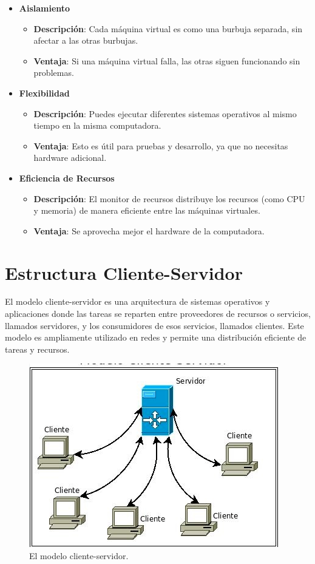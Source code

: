 \begin{itemize}
	\item \textbf{Aislamiento}
	\begin{itemize}
		\item \textbf{Descripción}: Cada máquina virtual es como una burbuja separada, sin afectar a las otras burbujas.
		\item \textbf{Ventaja}: Si una máquina virtual falla, las otras siguen funcionando sin problemas.
	\end{itemize}
	
	\item \textbf{Flexibilidad}
	\begin{itemize}
		\item \textbf{Descripción}: Puedes ejecutar diferentes sistemas operativos al mismo tiempo en la misma computadora.
		\item \textbf{Ventaja}: Esto es útil para pruebas y desarrollo, ya que no necesitas hardware adicional.
	\end{itemize}
	
	\item \textbf{Eficiencia de Recursos}
	\begin{itemize}
		\item \textbf{Descripción}: El monitor de recursos distribuye los recursos (como CPU y memoria) de manera eficiente entre las máquinas virtuales.
		\item \textbf{Ventaja}: Se aprovecha mejor el hardware de la computadora.
	\end{itemize}
	
\end{itemize}

\section{Estructura Cliente-Servidor}



El modelo cliente-servidor es una arquitectura de sistemas operativos y aplicaciones donde las tareas se reparten entre proveedores de recursos o servicios, llamados servidores, y los consumidores de esos servicios, llamados clientes. Este modelo es ampliamente utilizado en redes y permite una distribución eficiente de tareas y recursos.
\begin{figure}[H]
	\centering
	\includegraphics[width=0.7\linewidth]{Imagenes/cliente-servidor.png}
	\caption{El modelo cliente-servidor. }
	\label{fig:enter-label}
\end{figure}



